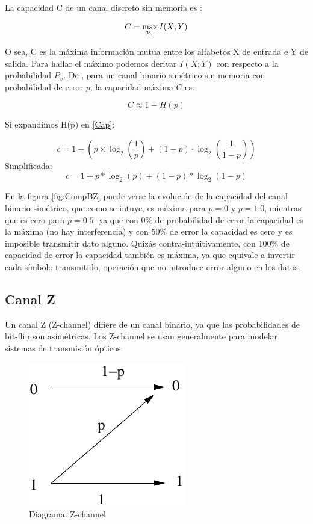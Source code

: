 La capacidad C de un canal discreto sin memoria es :

\begin{equation}
C = \max_{{\cal{P}}_x} I(X;Y) 
\end{equation}

O sea, C es la máxima información mutua entre los alfabetos X de entrada e Y de salida.
Para hallar el máximo podemos derivar $I(X;Y)$ con respecto a la probabilidad $P_x$.
De \cite{MacKay:2002}, para un canal binario simétrico sin memoria con probabilidad de error $p$, la capacidad máxima $C$ es:

\begin{equation}\label{Cap}
C \approx 1 - H(p) 
\end{equation}

Si expandimos H(p) en \ref{Cap}:

$$ c = 1-\left(p \times \log_2\left(\frac{1}{p}\right) + (1-p) \cdot \log_2\left(\frac{1}{1-p}\right)\right) $$
Simplificada:
$$ c = 1 + p * \log_2(p) + (1 - p) * \log_2(1-p) $$

En la figura \ref{fig:CompBZ} puede verse la evolución de la capacidad del canal binario simétrico, que como se intuye, es máxima para $p=0$ y $p=1.0$, mientras que es cero para $p=0.5$. ya que con 0\% de probabilidad de error la capacidad es la máxima (no hay interferencia) y con 50\% de error la capacidad es cero y es imposible transmitir dato alguno. Quizás contra-intuitivamente, con 100\% de capacidad de error la capacidad también es máxima, ya que equivale a invertir cada símbolo transmitido, operación que no introduce error alguno en los datos.


\subsection{Canal Z}
Un canal Z (Z-channel) difiere de un canal binario, ya que las probabilidades de bit-flip son asimétricas.
Los Z-channel se usan generalmente para modelar sistemas de transmisión ópticos.

\begin{figure}[th]
  \begin{center}
    \includegraphics[scale=0.5]{capacidad/zchannel}
  \end{center}
  \caption{Diagrama: Z-channel}
  \label{fig:Gal}
\end{figure}


